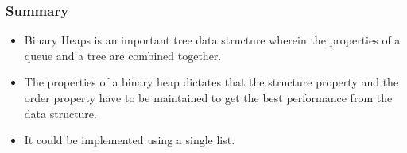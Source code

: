 \documentclass{beamer}
\begin{document}
\begin{frame}
\frametitle{Summary}
\begin{itemize}
\item Binary Heaps is an important tree data  structure wherein the properties of a queue and a tree are combined together.
\item The properties of a binary heap dictates that the structure property and the order property have to be maintained to get the best performance from the data structure.
\item It could be implemented using a single list.
\end{itemize}
\end{frame}
\end{document}
